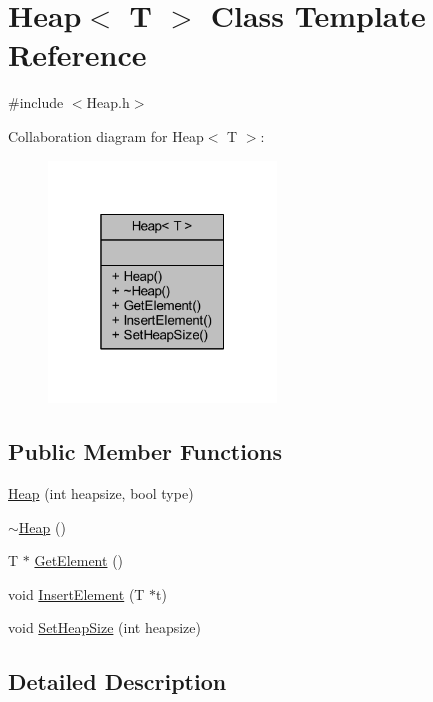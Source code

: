 \hypertarget{class_heap}{}\section{Heap$<$ T $>$ Class Template Reference}
\label{class_heap}


{\ttfamily \#include $<$Heap.\+h$>$}



Collaboration diagram for Heap$<$ T $>$\+:\nopagebreak
\begin{figure}[H]
\begin{center}
\leavevmode
\includegraphics[width=172pt]{class_heap__coll__graph}
\end{center}
\end{figure}
\subsection*{Public Member Functions}
\begin{DoxyCompactItemize}
\item 
\hyperlink{class_heap_ab0d9672cff1ce2a767ed5c75f2ec9b56}{Heap} (int heapsize, bool type)
\item 
\hyperlink{class_heap_a7887eec294f679fad13d8226ba7b3a44}{$\sim$\+Heap} ()
\item 
T $\ast$ \hyperlink{class_heap_ad3a597474f313c4b8a3d26f8f687afa2}{Get\+Element} ()
\item 
void \hyperlink{class_heap_aad789e01b5acbbebe0cceb62cf824832}{Insert\+Element} (T $\ast$t)
\item 
void \hyperlink{class_heap_a3b6ee5e7df307ff66d7d489c946c1745}{Set\+Heap\+Size} (int heapsize)
\end{DoxyCompactItemize}


\subsection{Detailed Description}
